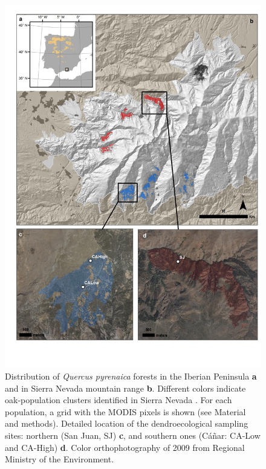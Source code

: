 \begin{figure}
\centering
\includegraphics[width=\textwidth]{img/dendro/dendro-mapa.jpg} \caption{Distribution of \textit{Quercus pyrenaica} forests in the Iberian Peninsula \textbf{a} and in Sierra Nevada mountain range \textbf{b}. Different colors indicate oak-population clusters identified in Sierra Nevada \autocite{PerezLuque2015}. For each population, a grid with the MODIS pixels is shown (see Material and methods). Detailed location of the dendroecological sampling sites: northern (San Juan, SJ) \textbf{c}, and southern ones (Cáñar: CA-Low and CA-High) \textbf{d}. Color orthophotography of 2009 from Regional Ministry of the Environment.}
\label{fig:dendro:map}
\end{figure}

